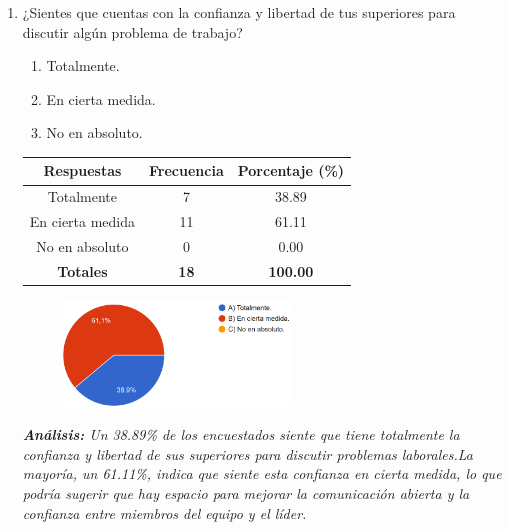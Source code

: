 \documentclass[journal]{IEEEtran}
\begin{document}
\begin{enumerate}
	\item ¿Sientes que cuentas con la confianza y libertad de tus superiores para discutir algún problema de trabajo?
	\begin{enumerate}
		\item Totalmente.
		\item En cierta medida.
		\item No en absoluto.
	\end{enumerate}
	\begin{table}[H]
		\renewcommand{\arraystretch}{1.3}
		\centering
		\begin{tabular}{|c|c|c|}
			\hline
			\textbf{Respuestas} & \textbf{Frecuencia} & \textbf{Porcentaje (\%)}\\
			\hline
			Totalmente & 7 & 38.89\\
			En cierta medida & 11 & 61.11\\
			No en absoluto & 0 & 0.00\\
			\hline
			\textbf{Totales} &\textbf{18}& \textbf{100.00}\\
			\hline
		\end{tabular}
	\end{table}
	\begin{figure}[h]
		\centering
		\includegraphics[width=06cm]{Pregunta16}
	\end{figure}
	\textit{\textbf{Análisis:} Un 38.89\% de los encuestados siente que tiene totalmente la confianza y libertad de sus superiores para discutir problemas laborales.La mayoría, un 61.11\%, indica que siente esta confianza en cierta medida, lo que podría sugerir que hay espacio para mejorar la comunicación abierta y la confianza entre miembros del equipo y el líder.}\\
	

\end{enumerate}
\end{document}
